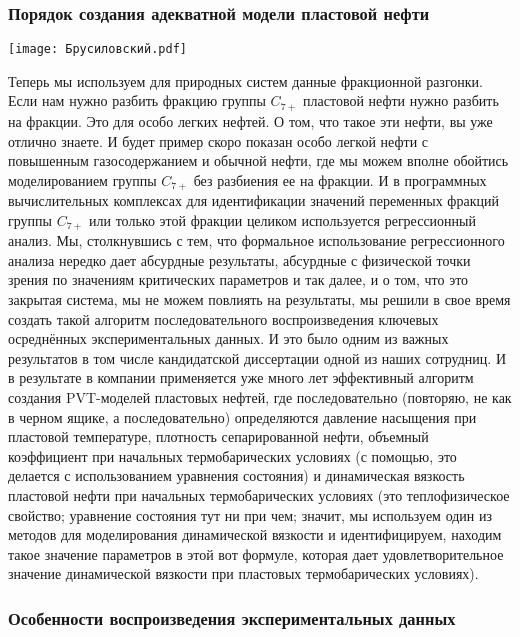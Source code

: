 \documentclass[main.tex]{subfiles}
\begin{document}
\subsubsection{Порядок создания адекватной модели пластовой нефти}

\begin{center}
\texttt{[image: Брусиловский.pdf]}
\end{center}

Теперь мы используем для природных систем данные фракционной разгонки.
Если нам нужно разбить фракцию группы $C_{7+}$ пластовой нефти нужно разбить на фракции.
Это для особо легких нефтей.
О том, что такое эти нефти, вы уже отлично знаете.
И будет пример скоро показан особо легкой нефти с повышенным газосодержанием и обычной нефти, где мы можем вполне обойтись моделированием группы $C_{7+}$ без разбиения ее на фракции.
И в программных вычислительных комплексах для идентификации значений переменных фракций группы $C_{7+}$ или только этой фракции целиком используется регрессионный анализ.
Мы, столкнувшись с тем, что формальное использование регрессионного анализа нередко дает абсурдные результаты, абсурдные с физической точки зрения по значениям критических параметров и так далее, и о том, что это закрытая система, мы не можем повлиять на результаты, мы решили в свое время создать такой алгоритм последовательного воспроизведения ключевых осреднённых экспериментальных данных.
И это было одним из важных результатов в том числе кандидатской диссертации одной из наших сотрудниц.
И в результате в компании применяется уже много лет эффективный алгоритм создания PVT-моделей пластовых нефтей, где последовательно (повторяю, не как в черном ящике, а последовательно) определяются давление насыщения при пластовой температуре, плотность сепарированной нефти, объемный коэффициент при начальных термобарических условиях (с помощью, это делается с использованием уравнения состояния) и динамическая вязкость пластовой нефти при начальных термобарических условиях (это теплофизическое свойство; уравнение состояния тут ни при чем; значит, мы используем один из методов для моделирования динамической вязкости и идентифицируем, находим такое значение параметров в этой вот формуле, которая дает удовлетворительное значение динамической вязкости при пластовых термобарических условиях).

\subsubsection{Особенности воспроизведения экспериментальных данных}
\end{document}
